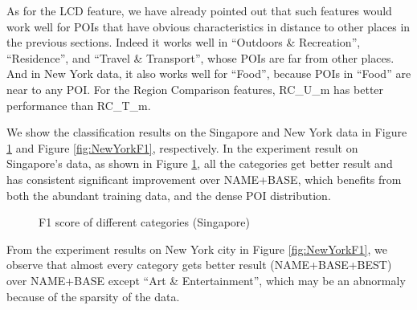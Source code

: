 As for the LCD feature, we have already pointed out that such features would work well
for POIs that have obvious characteristics in distance to other places in the previous sections.
Indeed it works well in ``Outdoors \& Recreation'', ``Residence'', and ``Travel \& Transport'',
whose POIs are far from other places. And in New York data, it also works well for ``Food'',
because POIs in ``Food'' are near to any POI. For the Region Comparison features,
RC\_U\_m has better performance than RC\_T\_m.


We show the classification results on the Singapore and New York data in 
Figure \ref{fig:SingaporeF1} and Figure \ref{fig:NewYorkF1}, respectively.
In the experiment result on Singapore's data,
as shown in Figure \ref{fig:SingaporeF1}, all the categories
get better result and has consistent significant improvement over NAME+BASE,
which benefits from both the abundant training data, and the dense POI distribution.

\begin{figure}[ht]
\centering
\caption{F1 score of different categories (Singapore)}
\label{fig:SingaporeF1}       %
\end{figure}

From the experiment results on New York city 
in Figure \ref{fig:NewYorkF1}, we observe that almost every 
category gets better result (NAME+BASE+BEST)
over NAME+BASE except ``Art \& Entertainment'', which may be an abnormaly 
because of the sparsity of the data. 

